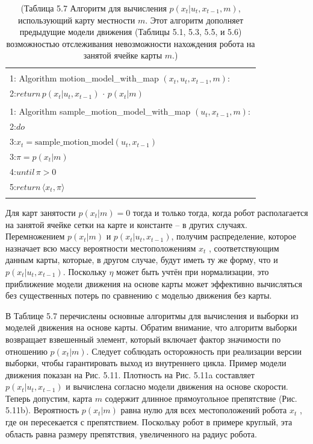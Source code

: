 \documentclass[10pt,a4paper]{article}
\begin{document}
\begin{table}[H]
\begin{center}
\begin{tabular}{|l|}
\hline
{}\\
1: \hspace{3mm} Algorithm motion\_model\_with\_map $(x_t,u_t,x_{t-1},m):$ \\
2:\hspace{7mm}$\textit{return}\,p(x_t|u_t,x_{t-1})\,\cdot\,p(x_t|m)$
\\
{}\\
1: \hspace{3mm} Algorithm sample\_motion\_model\_with\_map $(u_t,x_{t-1},m):$ \\
2:\hspace{7mm}$\textit{do}$
\\
3:\hspace{12mm}$x_t=\text{sample\_motion\_model}(u_t,x_{t-1})$\\
3:\hspace{12mm}$\pi=p(x_t|m)$\\
4:\hspace{7mm}$\textit{until}\,\pi>0$\\
5:\hspace{7mm}$\textit{return}\,\langle x_t,\pi\rangle$\\
{}\\
\hline
\end{tabular}
\caption{(Таблица 5.7 Алгоритм для вычисления $p(x_t | u_t, x_{t-1}, m)$, использующий карту местности $m$. Этот алгоритм дополняет предыдущие модели движения (Таблицы 5.1, 5.3,
5.5, и 5.6) возможностью отслеживания невозможности нахождения робота на занятой ячейке карты $m$.)}
\end{center}
\end{table}

Для карт занятости $p(x_t | m) = 0$ тогда и только тогда, когда робот располагается на занятой ячейке сетки на карте и константе – в других случаях. Перемножением $p(x_t | m)$
и $p(x_t | u_t, x_{t-1})$, получим распределение, которое назначает всю массу вероятности местоположениям $x_t$ , соответствующим данным карты, которые, в другом случае, будут иметь ту же форму, что и 
$p(x_t | u_t, x_{t-1})$. Поскольку $\eta$ может быть учтён при нормализации, это приближение модели движения на основе карты может эффективно вычисляться без существенных потерь по сравнению с моделью движения без карты.

В Таблице 5.7 перечислены основные алгоритмы для вычисления и выборки из моделей движения на основе карты. Обратим внимание, что алгоритм выборки возвращает взвешенный элемент, который включает фактор значимости по отношению $p(x_t | m)$. Следует соблюдать осторожность при реализации версии выборки, чтобы гарантировать выход из внутреннего цикла. Пример модели движения показан на Рис. 5.11. Плотность на Рис. 5.11a составляет $p(x_t | u_t, x_{t-1})$ и вычислена согласно модели движения на основе скорости. Теперь допустим, карта $m$ содержит длинное прямоугольное препятствие  (Рис. 5.11b). Вероятность $p(x_t | m)$ равна нулю для всех местоположений робота $x_t$ , где он пересекается с препятствием. Поскольку робот в примере круглый, эта область равна размеру препятствия, увеличенного на радиус робота. 
\end{document}
